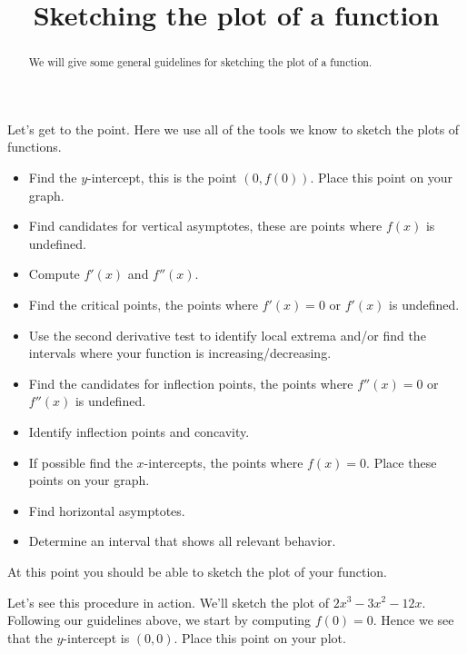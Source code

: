 \documentclass{ximera}
\title[Dig-In:]{Sketching the plot of a function}
\begin{document}
\begin{abstract}
  We will give some general guidelines for sketching the plot of a
  function.
\end{abstract}
\maketitle

Let's get to the point. Here we use all of the tools we know to sketch
the plots of functions.


\begin{itemize}
\item Find the $y$-intercept, this is the point $(0,f(0))$. Place this
  point on your graph.
\item Find candidates for vertical asymptotes, these are points where
  $f(x)$ is undefined.
\item Compute $f'(x)$ and $f''(x)$.
\item Find the critical points, the points where $f'(x) = 0$ or
  $f'(x)$ is undefined.
\item Use the second derivative test to identify local extrema and/or
  find the intervals where your function is increasing/decreasing.
\item Find the candidates for inflection points, the points where
  $f''(x) = 0$ or $f''(x)$ is undefined.
\item Identify inflection points and concavity.
\item If possible find the $x$-intercepts, the points where $f(x) =
  0$. Place these points on your graph.
\item Find horizontal asymptotes.
\item Determine an interval that shows all relevant behavior.
\end{itemize}
At this point you should be able to sketch the plot of your function.


Let's see this procedure in action. We'll sketch the plot of
$2x^3-3x^2-12x$.  Following our guidelines above, we start by
computing $f(0) = 0$.  Hence we see that the $y$-intercept is
$(0,0)$. Place this point on your plot.
\begin{image}
\end{image}
\end{document}
